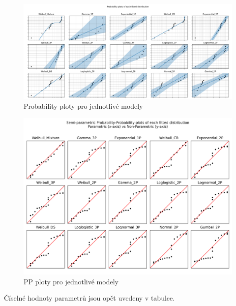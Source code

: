\documentclass[a4, 11pt]{article}
\theoremstyle{definition}
\theoremstyle{remark}
\begin{document}
	\begin{figure}[H]
		\centering
		\includegraphics[width=1.0\linewidth]{img/fiteverything_placebo_P_plots.png}
		\caption{Probability ploty pro jednotlivé modely}
		\label{fig:fit_everything_placebo_P_plots}
	\end{figure}
    
	\begin{figure}[H]
        \centering
        \includegraphics[width=0.8\linewidth]{img/fiteverything_placebo_PP_plots.png}
        \caption{PP ploty pro jednotlivé modely}
        \label{fig:fit_everything_placebo_PP_plots}
    \end{figure}
    
    Číselné hodnoty parametrů jsou opět uvedeny v tabulce.
    
\end{document}

